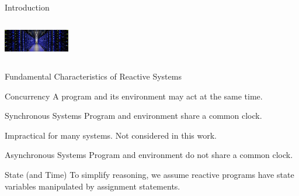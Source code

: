 \documentclass{beamer}
\begin{document}
\begin{frame}{Introduction\cite{manna1992temporal}}
\begin{columns}
\begin{column}{.3\textwidth}
\begin{center}
        \vspace*{12pt}

        \includegraphics[height=1cm]{servers.jpg}
      \end{center}

    \end{column}
  \end{columns}

\end{frame}

\begin{frame}{Fundamental Characteristics of Reactive Systems}

  \begin{block}{Concurrency}
    A program and its environment may act at the same time.
  \end{block}

  \begin{block}{Synchronous Systems}
    Program and environment share a common clock.

    Impractical for many systems.  Not considered in this work.
  \end{block}

  \begin{block}{Asynchronous Systems}
    Program and environment do not share a common clock.
  \end{block}

  \begin{block}{State (and Time)}
    To simplify reasoning, we assume reactive programs have state variables manipulated by assignment statements.
  \end{block}


\end{frame}
\end{document}
